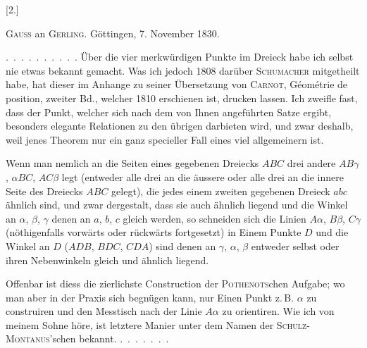 
\begin{center}
[2.]
\end{center}

\begin{center}
\textsc{Gauss} an \textsc{Gerling}. Göttingen, 7. November 1830.
\end{center}

\indent\mbox{. . . . . . . . . .} Über die vier merkwürdigen Punkte im Dreieck
habe ich selbst nie etwas bekannt gemacht. Was ich jedoch 1808 darüber
\textsc{Schumacher} mitgetheilt habe, hat dieser im Anhange zu seiner
Übersetzung von \textsc{Carnot}, Géométrie de position, zweiter
Bd., welcher 1810 erschienen ist, drucken lassen. Ich zweifle fast, dass
der Punkt, welcher sich nach dem von Ihnen angeführten Satze ergibt,
besonders elegante Relationen zu den übrigen darbieten wird, und zwar
deshalb, weil jenes Theorem nur ein ganz specieller Fall eines viel
allgemeinern ist.

Wenn man nemlich an die Seiten eines gegebenen Dreiecks $ABC$
drei andere $AB\gamma$, $\alpha BC$, $AC\beta$ legt (entweder alle drei
an die äussere oder alle drei an die innere Seite des Dreiecks
$ABC$ gelegt), die jedes einem zweiten gegebenen Dreieck $abc$ ähnlich
sind, und zwar dergestalt, dass sie auch ähnlich liegend und die Winkel an
$\alpha$, $\beta$, $\gamma$ denen an $a$, $b$, $c$ gleich werden, so
schneiden sich die Linien $A\alpha$, $B\beta$, $C\gamma$
(nöthigenfalls vorwärts oder rückwärts fortgesetzt) in Einem Punkte
$D$ und die Winkel an $D$ ($ADB$, $BDC$, $CDA$) sind
denen an $\gamma$, $\alpha$, $\beta$ entweder selbst oder ihren
Nebenwinkeln gleich und ähnlich liegend.

Offenbar ist diess die zierlichste Construction der
\textsc{Pothenots}chen Aufgabe; wo man aber in der Praxis sich begnügen
kann, nur Einen Punkt z.\,B. $\alpha$ zu construiren und den Messtisch nach
der Linie $A\alpha$ zu orientiren. Wie ich von meinem Sohne höre, ist
letztere Manier unter dem Namen der \textsc{Schulz-Montanus}'schen
bekannt. \mbox{. . . . . . .}
